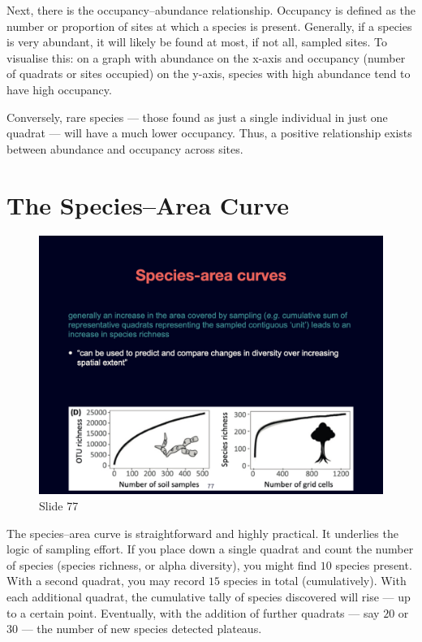 \documentclass[
  12pt,
]{book}
\begin{document}
Next, there is the occupancy--abundance relationship. Occupancy is
defined as the number or proportion of sites at which a species is
present. Generally, if a species is very abundant, it will likely be
found at most, if not all, sampled sites. To visualise this: on a graph
with abundance on the x-axis and occupancy (number of quadrats or sites
occupied) on the y-axis, species with high abundance tend to have high
occupancy.

Conversely, rare species --- those found as just a single individual in
just one quadrat --- will have a much lower occupancy. Thus, a positive
relationship exists between abundance and occupancy across sites.

\section{The Species--Area Curve}\label{the-speciesarea-curve}

\begin{figure}[ht]
\centering
\includegraphics[width=0.8\linewidth]{../images/BDC334/BDC334-077.jpeg}
\caption*{Slide 77}
\end{figure}

The species--area curve is straightforward and highly practical. It
underlies the logic of sampling effort. If you place down a single
quadrat and count the number of species (species richness, or alpha
diversity), you might find \(10\) species present. With a second
quadrat, you may record \(15\) species in total (cumulatively). With
each additional quadrat, the cumulative tally of species discovered will
rise --- up to a certain point. Eventually, with the addition of further
quadrats --- say \(20\) or \(30\) --- the number of new species detected
plateaus.
\end{document}
